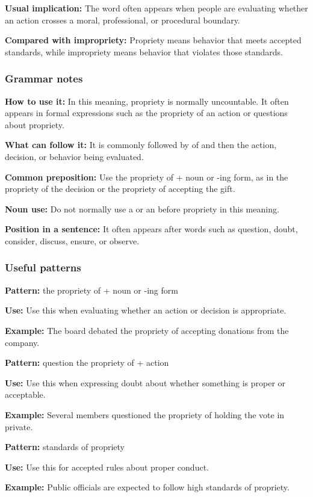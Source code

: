 \documentclass[11pt]{article}
\begin{document}
\textbf{Usual implication:} The word often appears when people are evaluating whether an action crosses a moral, professional, or procedural boundary.

\textbf{Compared with impropriety:} Propriety means behavior that meets accepted standards, while impropriety means behavior that violates those standards.

\subsubsection{Grammar notes}
\textbf{How to use it:} In this meaning, propriety is normally uncountable. It often appears in formal expressions such as the propriety of an action or questions about propriety.

\textbf{What can follow it:} It is commonly followed by of and then the action, decision, or behavior being evaluated.

\textbf{Common preposition:} Use the propriety of + noun or -ing form, as in the propriety of the decision or the propriety of accepting the gift.

\textbf{Noun use:} Do not normally use a or an before propriety in this meaning.

\textbf{Position in a sentence:} It often appears after words such as question, doubt, consider, discuss, ensure, or observe.

\subsubsection{Useful patterns}
\textbf{Pattern:} the propriety of + noun or -ing form

\textbf{Use:} Use this when evaluating whether an action or decision is appropriate.

\textbf{Example:} The board debated the propriety of accepting donations from the company.

\textbf{Pattern:} question the propriety of + action

\textbf{Use:} Use this when expressing doubt about whether something is proper or acceptable.

\textbf{Example:} Several members questioned the propriety of holding the vote in private.

\textbf{Pattern:} standards of propriety

\textbf{Use:} Use this for accepted rules about proper conduct.

\textbf{Example:} Public officials are expected to follow high standards of propriety.
\end{document}
